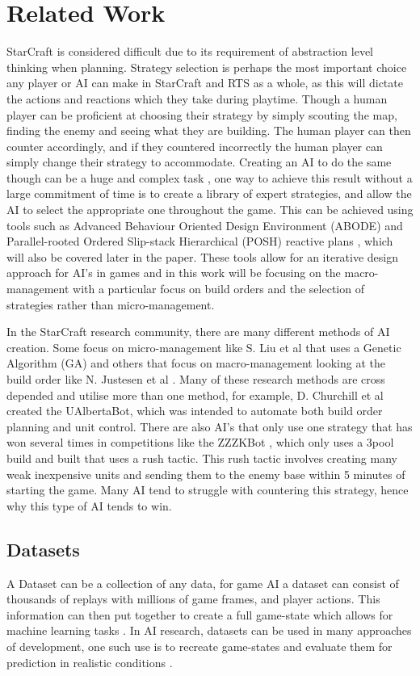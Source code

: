 \documentclass[journal]{IEEEtran}
\begin{document}
\section{Related Work}
StarCraft is considered difficult due to its requirement of abstraction level thinking when planning. Strategy selection is perhaps the most important choice any player or AI can make in StarCraft and RTS as a whole, as this will dictate the actions and reactions which they take during playtime. Though a human player can be proficient at choosing their strategy by simply scouting the map, finding the enemy and seeing what they are building. The human player can then counter accordingly, and if they countered incorrectly the human player can simply change their strategy to accommodate. Creating an AI to do the same though can be a huge and complex task \cite{Fuzzy,OnlineEvo,GoalDriven}, one way to achieve this result without a large commitment of time is to create a library of expert strategies, and allow the AI to select the appropriate one throughout the game. This can be achieved using tools such as Advanced Behaviour Oriented Design Environment (ABODE) and Parallel-rooted Ordered Slip-stack Hierarchical (POSH) reactive plans \cite{POSH}, which will also be covered later in the paper. These tools allow for an iterative design approach for AI's in games and in this work will be focusing on the macro-management with a particular focus on build orders and the selection of strategies rather than micro-management. 

In the StarCraft research community, there are many different methods of AI creation. Some focus on micro-management like S. Liu et al \cite{EffectiveMicro} that uses a Genetic Algorithm (GA) and others that focus on macro-management looking at the build order like N. Justesen et al \cite{OnlineEvo}. Many of these research methods are cross depended and utilise more than one method, for example, D. Churchill et al \cite{Agents} created the UAlbertaBot, which was intended to automate both build order planning and unit control. There are also AI's that only use one strategy that has won several times in competitions like the ZZZKBot \cite{ZZZK,Results}, which only uses a 3pool build and built that uses a rush tactic. This rush tactic involves creating many weak inexpensive units and sending them to the enemy base within 5 minutes of starting the game. Many AI tend to struggle with countering this strategy, hence why this type of AI tends to win.

\subsection{Datasets}
A Dataset can be a collection of any data, for game AI a dataset can consist of thousands of replays with millions of game frames, and player actions\cite{Dataset}. This information can then put together to create a full game-state which allows for machine learning tasks \cite{Dataset17}. In AI research, datasets can be used in many approaches of development, one such use is to recreate game-states and evaluate them for prediction in realistic conditions \cite{SpecialTactics}.
\end{document}
